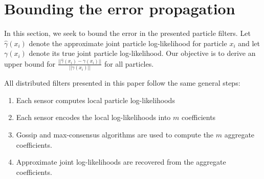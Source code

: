 \documentclass[10pt,letterpaper,final]{article}
\begin{document}
%


\section{Bounding the error propagation}
In this section, we seek to bound the error in the presented particle filters. Let $\hat{\gamma}(x_i)$ denote the approximate joint particle log-likelihood for particle $x_i$ and let $\gamma(x_i)$ denote its true joint particle log-likelihood. Our objective is to derive an upper bound for $\frac{||\hat{\gamma}(x_i)-\gamma(x_i)||}{||\gamma(x_i)||}$ for all particles.

All distributed filters presented in this paper follow the same general steps:
\begin{enumerate}
\item Each sensor computes local particle log-likelihoods
\item Each sensor encodes the local log-likelihoods into $m$ coefficients
\item Gossip and max-consensus algorithms are used to compute the $m$ aggregate coefficients. 
\item Approximate joint log-likelihoods are recovered from the aggregate coefficients. 
\end{enumerate}
\end{document}
